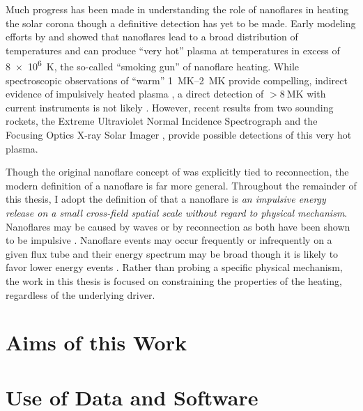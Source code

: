 Much progress has been made in understanding the role of nanoflares in heating the solar corona though a definitive detection has yet to be made. Early modeling efforts by \citet{cargill_implications_1994} and \citet{cargill_nanoflare_2004} showed that nanoflares lead to a broad distribution of temperatures and can produce ``very hot'' plasma at temperatures in excess of \SI{8e6}{\kelvin}, the so-called ``smoking gun'' of nanoflare heating. While spectroscopic observations of ``warm'' \SIrange{1}{2}{\mega\kelvin} provide compelling, indirect evidence of impulsively heated plasma \citep[e.g.]{warren_constraints_2011,warren_systematic_2012,viall_evidence_2012}, a direct detection of $>\SI{8}{\mega\kelvin}$ with current instruments is not likely \citet{winebarger_defining_2012}. However, recent results from two sounding rockets, the Extreme Ultraviolet Normal Incidence Spectrograph \citep[EUNIS,][]{brosius_pervasive_2014} and the Focusing Optics X-ray Solar Imager \citep[FOXSI,][]{ishikawa_detection_2017}, provide possible detections of this very hot plasma.

Though the original nanoflare concept of \citet{parker_nanoflares_1988} was explicitly tied to reconnection, the modern definition of a nanoflare is far more general. Throughout the remainder of this thesis, I adopt the definition of \citet{klimchuk_key_2015} that a nanoflare is \textit{an impulsive energy release on a small cross-field spatial scale without regard to physical mechanism}. Nanoflares may be caused by waves or by reconnection as both have been shown to be impulsive \citep{klimchuk_solving_2006,klimchuk_key_2015}. Nanoflare events may occur frequently or infrequently on a given flux tube and their energy spectrum may be broad though it is likely to favor lower energy events \citep{hudson_solar_1991}. Rather than probing a specific physical mechanism, the work in this thesis is focused on constraining the properties of the heating, regardless of the underlying driver.

\section{Aims of this Work}\label{sec:aims}

\section{Use of Data and Software}\label{sec:software-data}



